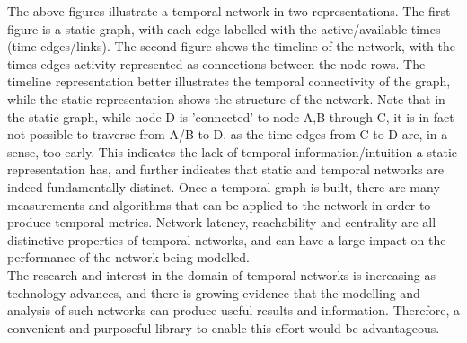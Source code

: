 \begin{introduction}
\begin{figure}
\end{figure}
The above figures illustrate a temporal network in two representations. The first figure is a static graph, with each edge labelled with the active/available times (time-edges/links). The second figure shows the timeline of the network, with the times-edges activity represented as connections between the node rows. The timeline representation better illustrates the temporal connectivity of the graph, while the static representation shows the structure of the network. Note that in the static graph, while node D is 'connected' to node A,B through C, it is in fact not possible to traverse from A/B to D, as the time-edges from C to D are, in a sense, too early. This indicates the lack of temporal information/intuition a static representation has, and further indicates that static and temporal networks are indeed fundamentally distinct.
Once a temporal graph is built, there are many measurements and algorithms that can be applied to the network in order to produce temporal metrics. Network latency, reachability and centrality are all distinctive properties of temporal networks, and can have a large impact on the performance of the network being modelled.\\
The research and interest in the domain of temporal networks is increasing as technology advances, and there is growing evidence \cite{social_metrics} that the modelling and analysis of such networks can produce useful results and information. Therefore, a convenient and purposeful library to enable this effort would be advantageous.
\end{introduction}
\vspace{1cm}
\clearpage